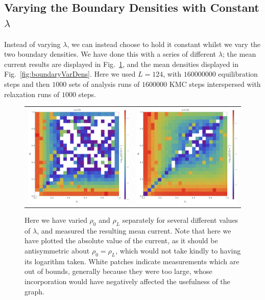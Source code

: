 \subsection{Varying the Boundary Densities with Constant $\lambda$}
Instead of varying $\lambda$, we can instead choose to hold it constant whilst we vary the two
boundary densities. We have done this with a series of different $\lambda$; the mean current results
are displayed in Fig.~\ref{fig:boundaryVarCurr}, and the mean densities displayed in 
Fig.~\ref{fig:boundaryVarDens}. Here we used $L=124$, with $160000000$ equilibration steps and then
$1000$ sets of analysis runs of $1600000$ KMC steps interspersed with relaxation runs of 
$1000$ steps.
\begin{figure} \caption[Mean currents observed when varying the boundary densities, fixing $\lambda$,
for different $\lambda$]{Here we have varied $\rho_0$ and $\rho_L$ separately for several different 
values of $\lambda$, and measured the resulting mean current. Note that here we have plotted the 
absolute value of the current, as it should be antisymmetric about $\rho_0 = \rho_L$, which would
not take kindly to having its logarithm taken. White patches indicate measurements
which are out of bounds, generally because they were too large, whose
incorporation would have negatively affected the usefulness of the graph.} 
\label{fig:boundaryVarCurr}
\begin{center}
\begin{tabular}{c c} 
\includegraphics[width=0.49\linewidth]{numerics/images/concFrames/concDataCurr0p05.png} &
\includegraphics[width=0.49\linewidth]{numerics/images/concFrames/concDataCurr0p09.png} \\

\end{tabular}
\end{center}
\end{figure}
